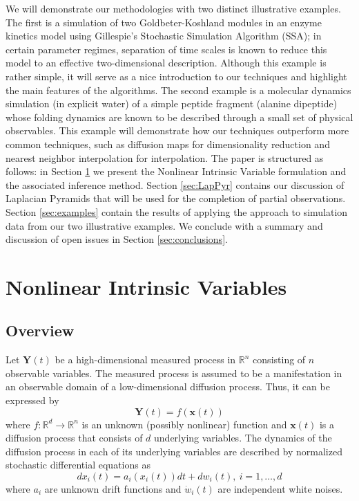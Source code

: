 \documentclass[aip,jcp,preprint]{revtex4-1}
\begin{document}
We will demonstrate our methodologies with two distinct illustrative examples.
%
The first is a simulation
of two Goldbeter-Koshland modules in an enzyme kinetics model \cite{zagaris2012stability} using Gillespie's Stochastic Simulation
Algorithm (SSA); in certain parameter regimes, separation of time scales is known
to reduce this model to an effective two-dimensional description.
%
Although this example is rather simple, it will serve as a nice introduction to our techniques and highlight the main features of the algorithms.
%
The second example is a molecular dynamics
simulation (in explicit water) of a simple peptide fragment (alanine dipeptide) whose folding
dynamics are known to be described through a small set of physical observables.
%
This example will demonstrate how our techniques outperform more common techniques,
such as diffusion maps for dimensionality reduction
and nearest neighbor interpolation for interpolation.
%
The paper is structured as follows: in Section \ref{sec:NIV} we present the Nonlinear Intrinsic Variable formulation and
the associated inference method.
%
Section \ref{sec:LapPyr} contains our discussion of Laplacian Pyramids that
will be used for the completion of partial observations.
%
Section \ref{sec:examples} contain the results
of applying the approach to simulation data from our two illustrative examples.
%
We conclude with
a summary and discussion of open issues in Section \ref{sec:conclusions}.

\section{Nonlinear Intrinsic Variables} \label{sec:NIV}

\subsection{Overview}
Let $\mathbf{Y}(t)$ be a high-dimensional measured process in $\mathbb{R}^n$ consisting of $n$ observable variables.
The measured process is assumed to be a manifestation in an observable domain of a low-dimensional diffusion process. Thus, it can be expressed by
\begin{equation}
	\mathbf{Y}(t) = f(\mathbf{x}(t))
\end{equation}
where $f:\mathbb{R}^d \rightarrow \mathbb{R}^n$ is an unknown (possibly nonlinear) function and $\mathbf{x}(t)$ is a diffusion process that consists of $d$ underlying variables.
%
The dynamics of the diffusion process in each of its underlying variables are described by normalized stochastic differential equations as
\begin{equation}
	d x_i(t) = a_i (x_i(t)) dt + d w_i(t), \ i=1,\ldots,d
\end{equation}
where $a_i$ are unknown drift functions and $\dot{w}_i(t)$ are independent white noises.
\end{document}
